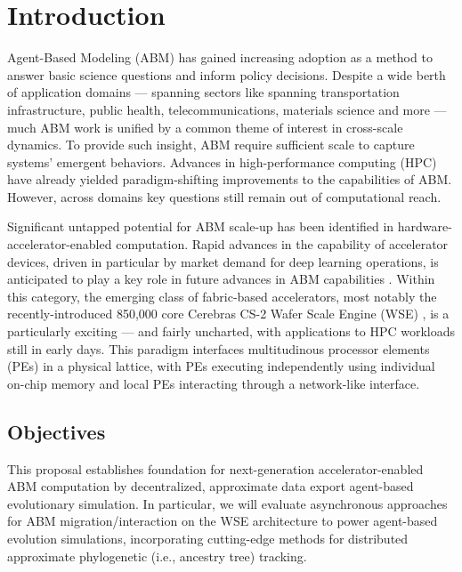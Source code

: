 \section{Introduction} \label{sec:introduction}

Agent-Based Modeling (ABM) has gained increasing adoption as a method to answer basic science questions and inform policy decisions.
Despite a wide berth of application domains --- spanning sectors like spanning transportation infrastructure, public health, telecommunications, materials science and more --- much ABM work is unified by a common theme of interest in cross-scale dynamics.
To provide such insight, ABM require sufficient scale to capture systems' emergent behaviors.
Advances in high-performance computing (HPC) have already yielded paradigm-shifting improvements to the capabilities of ABM.
However, across domains key questions still remain out of computational reach.


Significant untapped potential for ABM scale-up has been identified in hardware-accelerator-enabled computation.
Rapid advances in the capability of accelerator devices, driven in particular by market demand for deep learning operations, is anticipated to play a key role in future advances in ABM capabilities \citep{perumalla2022computer}.
Within this category, the emerging class of fabric-based accelerators, most notably the recently-introduced 850,000 core Cerebras CS-2 Wafer Scale Engine (WSE) \citep{lauterbach2021path,lie2022cerebras}, is a particularly exciting --- and fairly uncharted, with applications to HPC workloads still in early days.
This paradigm interfaces multitudinous processor elements (PEs) in a physical lattice, with PEs executing independently using individual on-chip memory and local PEs interacting through a network-like interface.

\subsection{Objectives}

This proposal establishes foundation for next-generation accelerator-enabled ABM computation by  decentralized, approximate data export  agent-based evolutionary simulation.
In particular, we will evaluate asynchronous approaches for ABM migration/interaction on the WSE architecture to power agent-based evolution simulations, incorporating cutting-edge methods for distributed approximate phylogenetic (i.e., ancestry tree) tracking.

